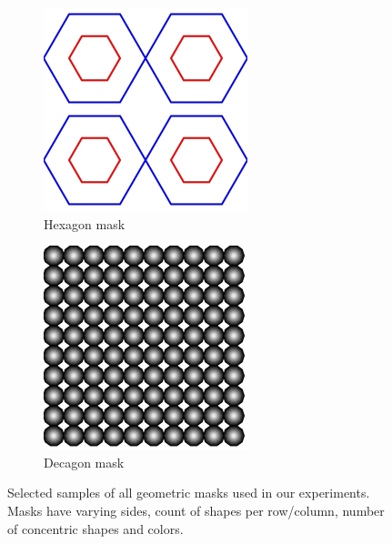 \documentclass[a4paper, oneside]{discothesis}
\begin{document}
\begin{figure}[th]
	\hfill
	\begin{subfigure}[t]{0.19\textwidth}\centering\includegraphics[width=\linewidth]{figures/6_2_2_True.png}\caption{Hexagon mask}\label{fig:atk3}\end{subfigure}
	\hfill
	\begin{subfigure}[t]{0.19\textwidth}\centering\includegraphics[width=\linewidth]{figures/10_10_10_False.png}\caption{Decagon mask}\label{fig:atk4}\end{subfigure}

	\caption{Selected samples of all geometric masks used in our experiments. Masks have varying sides, count of shapes per row/column, number of concentric shapes and colors.}
	\label{fig:attacks-v2}
\end{figure}
\end{document}
